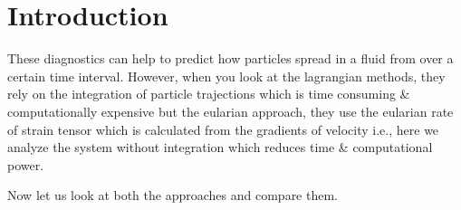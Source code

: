 \documentclass[../report.tex]{subfiles}
\begin{document}
{\let\clearpage\relax \chapter{Introduction}}

These diagnostics can help to predict how particles spread in a fluid from over a certain time interval. However, when you look at the lagrangian methods, they rely on the integration of particle trajections which is time consuming \& computationally expensive but the eularian approach, they use the eularian rate of strain tensor which is calculated from the gradients of velocity i.e., here we analyze the system without integration which reduces time \& computational power. \par 

Now let us look at both the approaches and compare them.
\end{document}
